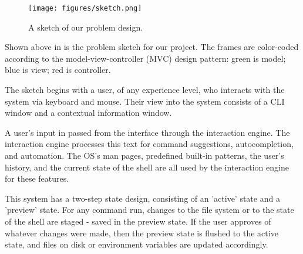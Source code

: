 \begin{figure}[h]
  \centering
  \texttt{[image: figures/sketch.png]}
  \caption{A sketch of our problem design.}
  \label{fig:sketch}
\end{figure}

Shown above in  is the problem sketch for our project. The
frames are color-coded according to the model-view-controller (MVC) design
pattern: green is model; blue is view; red is controller.

The sketch begins
with a user, of any experience level, who interacts with the system via keyboard
and mouse. Their view into the system consists of a CLI window and a contextual
information window.

A user's input in passed from the interface through the
interaction engine. The interaction engine processes this text for command
suggestions, autocompletion, and automation. The OS's man pages, predefined
built-in patterns, the user's history, and the current state of the shell are
all used by the interaction engine for these features.

This system has a two-step state design, consisting of an 'active' state and a
'preview' state. For any command run, changes to the file system or to the state
of the shell are staged - saved in the preview state. If the user approves of
whatever changes were made, then the preview state is flushed to the active
state, and files on disk or environment variables are updated accordingly.
